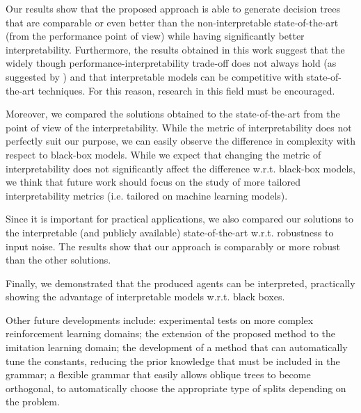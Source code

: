 \documentclass[review,english]{elsarticle}
\begin{document}
Our results show that the proposed approach is able to generate decision trees that are comparable or even better than the non-interpretable state-of-the-art (from the performance point of view) while having significantly better interpretability.
Furthermore, the results obtained in this work suggest that the widely though performance-interpretability trade-off does not always hold (as suggested by \cite{rudin_stop_2019}) and that interpretable models can be competitive with state-of-the-art techniques. For this reason, research in this field must be encouraged.

Moreover, we compared the solutions obtained to the state-of-the-art from the point of view of the interpretability. 
While the metric of interpretability does not perfectly suit our purpose, we can easily observe the difference in complexity with respect to black-box models.
While we expect that changing the metric of interpretability does not significantly affect the difference w.r.t. black-box models, we think that future work should focus on the study of more tailored interpretability metrics (i.e. tailored on machine learning models).

Since it is important for practical applications, we also compared our solutions to the interpretable (and publicly available) state-of-the-art w.r.t. robustness to input noise.
The results show that our approach is comparably or more robust than the other solutions.

Finally, we demonstrated that the produced agents can be interpreted, practically showing the advantage of interpretable models w.r.t. black boxes.



Other future developments include: experimental tests on more complex reinforcement learning domains; the extension of the proposed method to the imitation learning domain; the development of a method that can automatically tune the constants, reducing the prior knowledge that must be included in the grammar; a flexible grammar that easily allows oblique trees to become orthogonal, to automatically choose the appropriate type of splits depending on the problem.



\end{document}
